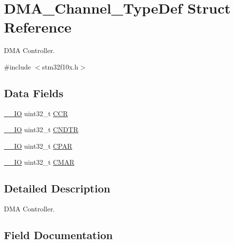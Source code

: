 \hypertarget{struct_d_m_a___channel___type_def}{}\section{D\+M\+A\+\_\+\+Channel\+\_\+\+Type\+Def Struct Reference}
\label{struct_d_m_a___channel___type_def}


D\+MA Controller.  




{\ttfamily \#include $<$stm32f10x.\+h$>$}

\subsection*{Data Fields}
\begin{DoxyCompactItemize}
\item 
\mbox{\hyperlink{core__sc300_8h_aec43007d9998a0a0e01faede4133d6be}{\+\_\+\+\_\+\+IO}} uint32\+\_\+t \mbox{\hyperlink{struct_d_m_a___channel___type_def_a5e1322e27c40bf91d172f9673f205c97}{C\+CR}}
\item 
\mbox{\hyperlink{core__sc300_8h_aec43007d9998a0a0e01faede4133d6be}{\+\_\+\+\_\+\+IO}} uint32\+\_\+t \mbox{\hyperlink{struct_d_m_a___channel___type_def_aae019365e4288337da20775971c1a123}{C\+N\+D\+TR}}
\item 
\mbox{\hyperlink{core__sc300_8h_aec43007d9998a0a0e01faede4133d6be}{\+\_\+\+\_\+\+IO}} uint32\+\_\+t \mbox{\hyperlink{struct_d_m_a___channel___type_def_a07aacf332c9bf310ff5be02140f892e1}{C\+P\+AR}}
\item 
\mbox{\hyperlink{core__sc300_8h_aec43007d9998a0a0e01faede4133d6be}{\+\_\+\+\_\+\+IO}} uint32\+\_\+t \mbox{\hyperlink{struct_d_m_a___channel___type_def_ab51edd49cb9294ebe2db18fb5cf399dd}{C\+M\+AR}}
\end{DoxyCompactItemize}


\subsection{Detailed Description}
D\+MA Controller. 

\subsection{Field Documentation}
\mbox{\label{struct_d_m_a___channel___type_def_a5e1322e27c40bf91d172f9673f205c97}} 
